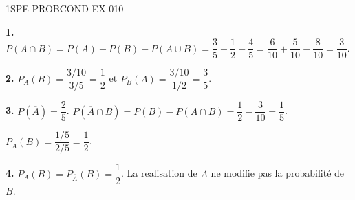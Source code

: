 \begin{corrige}{1SPE-PROBCOND-EX-010}

\textbf{1.} $P(A \cap B) = P(A) + P(B) - P(A \cup B) = \dfrac{3}{5} + \dfrac{1}{2} - \dfrac{4}{5} = \dfrac{6}{10} + \dfrac{5}{10} - \dfrac{8}{10} = \dfrac{3}{10}$.

\medskip
\textbf{2.} $P_A(B) = \dfrac{3/10}{3/5} = \dfrac{1}{2}$ et $P_B(A) = \dfrac{3/10}{1/2} = \dfrac{3}{5}$.

\medskip
\textbf{3.} $P(\overline{A}) = \dfrac{2}{5}$. $P(\overline{A} \cap B) = P(B) - P(A \cap B) = \dfrac{1}{2} - \dfrac{3}{10} = \dfrac{1}{5}$.

$P_{\overline{A}}(B) = \dfrac{1/5}{2/5} = \dfrac{1}{2}$.

\medskip
\textbf{4.} $P_A(B) = P_{\overline{A}}(B) = \dfrac{1}{2}$. La realisation de $A$ ne modifie pas la probabilité de $B$.

\end{corrige}
